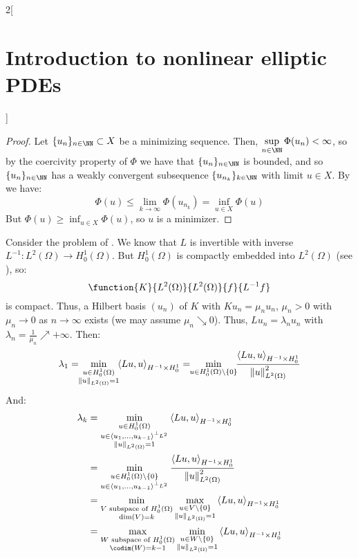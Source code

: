 \documentclass[../../../main_math.tex]{subfiles}
\begin{document}
\begin{multicols}{2}[\section{Introduction to nonlinear elliptic PDEs}]
\begin{proof}
    Let $\{u_n\}_{n\in\NN}\subset X$ be a minimizing sequence. Then, $\displaystyle\sup_{n\in\NN}\Phi(u_n)<\infty$, so by the coercivity property of $\Phi$ we have that $\{u_n\}_{n\in\NN}$ is bounded, and so $\{u_n\}_{n\in\NN}$ has a weakly convergent subsequence $\{u_{n_k}\}_{k\in\NN}$ with limit $u\in X$. By  we have:
    $$
      \Phi(u)\leq \lim_{k\to\infty}\Phi(u_{n_k})=\inf_{u\in X}\Phi(u)
    $$
    But $\displaystyle\Phi(u)\geq \inf_{u\in X}\Phi(u)$, so $u$ is a minimizer.
  \end{proof}
  \begin{theorem}
    Consider the problem of . We know that $L$ is invertible with inverse $L^{-1}:L^2(\Omega)\to H_0^1(\Omega)$. But $H_0^1(\Omega)$ is compactly embedded into $L^2(\Omega)$ (see ), so:
    $$
      \function{K}{L^2(\Omega)}{L^2(\Omega)}{f}{L^{-1}f}
    $$
    is compact. Thus, a Hilbert basis $(u_n)$ of $K$ with $Ku_n=\mu_n u_n$, $\mu_n>0$ with $\mu_n\to 0$ as $n\to\infty$ exists (we may assume $\mu_n\searrow 0$). Thus, $Lu_n=\lambda_nu_n$ with $\lambda_n=\frac{1}{\mu_n}\nearrow+\infty$. Then:
    $$
      \lambda_1=\!\!\min_{\substack{u\in H_0^1(\Omega) \\ \norm{u}_{L^2(\Omega)}=1}}\!\!{\langle Lu,u\rangle}_{H^{-1}\times H_0^1}=\!\!\min_{u\in H_0^1(\Omega)\setminus\{0\}}\!\!\frac{{\langle Lu,u\rangle}_{H^{-1}\times H_0^1}}{\norm{u}_{L^2(\Omega)}^2}
    $$
    And:
    \begin{align*}
      \lambda_k & =\min_{\substack{u\in H_0^1(\Omega)                   \\u\in\langle u_1,\dots,u_{k-1}\rangle^{\perp_{L^2}}\\ \norm{u}_{L^2(\Omega)}=1}}{\langle Lu,u\rangle}_{H^{-1}\times H_0^1}\\
                & = \min_{\substack{u\in H_0^1(\Omega)\setminus\{0\}    \\ u\in\langle u_1,\dots,u_{k-1}\rangle^{\perp_{L^2}}}}\frac{{\langle Lu,u\rangle}_{H^{-1}\times H_0^1}}{\norm{u}_{L^2(\Omega)}^2}\\
                & =\min_{\substack{V\text{ subspace of }H_0^1(\Omega)   \\ \dim(V)=k}}\max_{\substack{u\in V\setminus\{0\} \\ \norm{u}_{L^2(\Omega)}=1}}{\langle Lu,u\rangle}_{H^{-1}\times H_0^1}\\
                & = \max_{\substack{W\text{ subspace of } H_0^1(\Omega) \\ \codim(W)=k-1}}\min_{\substack{u\in W\setminus\{0\} \\ \norm{u}_{L^2(\Omega)}=1}}{\langle Lu,u\rangle}_{H^{-1}\times H_0^1}

\end{align*}
\end{theorem}
\end{multicols}
\end{document}

